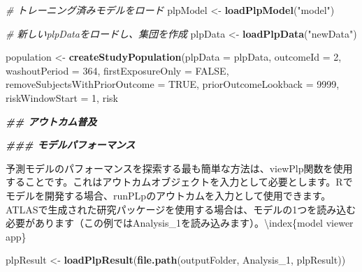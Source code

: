 \documentclass[
  11pt]{book}
\newenvironment{Shaded}{\begin{snugshade}}{\end{snugshade}}
\newcommand{\AttributeTok}[1]{\textcolor[rgb]{0.13,0.29,0.53}{#1}}
\newcommand{\CommentTok}[1]{\textcolor[rgb]{0.56,0.35,0.01}{\textit{#1}}}
\newcommand{\ConstantTok}[1]{\textcolor[rgb]{0.56,0.35,0.01}{#1}}
\newcommand{\DecValTok}[1]{\textcolor[rgb]{0.00,0.00,0.81}{#1}}
\newcommand{\DocumentationTok}[1]{\textcolor[rgb]{0.56,0.35,0.01}{\textbf{\textit{#1}}}}
\newcommand{\FunctionTok}[1]{\textcolor[rgb]{0.13,0.29,0.53}{\textbf{#1}}}
\newcommand{\NormalTok}[1]{#1}
\newcommand{\OtherTok}[1]{\textcolor[rgb]{0.56,0.35,0.01}{#1}}
\newcommand{\StringTok}[1]{\textcolor[rgb]{0.31,0.60,0.02}{#1}}
\theoremstyle{definition}
\theoremstyle{definition}
\theoremstyle{definition}
\theoremstyle{definition}
\theoremstyle{remark}
\begin{document}
\begin{Shaded}
\begin{Highlighting}[]
\CommentTok{\# トレーニング済みモデルをロード}
\NormalTok{plpModel }\OtherTok{\textless{}{-}} \FunctionTok{loadPlpModel}\NormalTok{(}\StringTok{"model"}\NormalTok{)}

\CommentTok{\# 新しいplpDataをロードし、集団を作成}
\NormalTok{plpData }\OtherTok{\textless{}{-}} \FunctionTok{loadPlpData}\NormalTok{(}\StringTok{"newData"}\NormalTok{)}

\NormalTok{population }\OtherTok{\textless{}{-}} \FunctionTok{createStudyPopulation}\NormalTok{(}\AttributeTok{plpData =}\NormalTok{ plpData,}
                                    \AttributeTok{outcomeId =} \DecValTok{2}\NormalTok{,}
                                    \AttributeTok{washoutPeriod =} \DecValTok{364}\NormalTok{,}
                                    \AttributeTok{firstExposureOnly =} \ConstantTok{FALSE}\NormalTok{,}
                                    \AttributeTok{removeSubjectsWithPriorOutcome =} \ConstantTok{TRUE}\NormalTok{,}
                                    \AttributeTok{priorOutcomeLookback =} \DecValTok{9999}\NormalTok{,}
                                    \AttributeTok{riskWindowStart =} \DecValTok{1}\NormalTok{,}
\NormalTok{                                    risk}
                                    
\DocumentationTok{\#\# アウトカム普及}

\DocumentationTok{\#\#\# モデルパフォーマンス}

\NormalTok{予測モデルのパフォーマンスを探索する最も簡単な方法は、}\StringTok{\textasciigrave{}}\AttributeTok{viewPlp}\StringTok{\textasciigrave{}}\NormalTok{関数を使用することです。これはアウトカムオブジェクトを入力として必要とします。Rでモデルを開発する場合、}\StringTok{\textasciigrave{}}\AttributeTok{runPLp}\StringTok{\textasciigrave{}}\NormalTok{のアウトカムを入力として使用できます。ATLASで生成された研究パッケージを使用する場合は、モデルの1つを読み込む必要があります（この例ではAnalysis\_1を読み込みます）。\textbackslash{}index\{model viewer app\}}
\end{Highlighting}
\end{Shaded}

\begin{Shaded}
\begin{Highlighting}[]
\NormalTok{plpResult }\OtherTok{\textless{}{-}} \FunctionTok{loadPlpResult}\NormalTok{(}\FunctionTok{file.path}\NormalTok{(outputFolder,}
                                     \StringTok{\textquotesingle{}Analysis\_1\textquotesingle{}}\NormalTok{,}
                                     \StringTok{\textquotesingle{}plpResult\textquotesingle{}}\NormalTok{))}
\end{Highlighting}
\end{Shaded}
\end{document}
